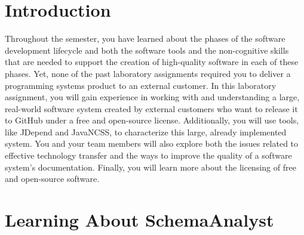 

\usepackage[compact]{titlesec}

\usepackage[url=false,
    backend=biber,
    style=authoryear,
    doi=false,
    isbn=false,
    backref=false,
    dashed=false,                                   %
    maxnames=99,                                    %
    sorting=ydnt]{biblatex}                         %





\vspace*{-.1in}
\section*{Introduction}

\nocite{*}

Throughout the semester, you have learned about the phases of the software development lifecycle and both the software
tools and the non-cognitive skills that are needed to support the creation of high-quality software in each of these
phases. Yet, none of the past laboratory assignments required you to deliver a programming systems product to an
external customer. In this laboratory assignment, you will gain experience in working with and understanding a large,
real-world software system created by external customers who want to release it to GitHub under a free and open-source
license.  Additionally, you will use tools, like JDepend and JavaNCSS, to characterize this large, already implemented
system. You and your team members will also explore both the issues related to effective technology transfer and the
ways to improve the quality of a software system's documentation. Finally, you will learn more about the licensing of
free and open-source software.

\vspace*{-.05in}
\section*{Learning About SchemaAnalyst}

